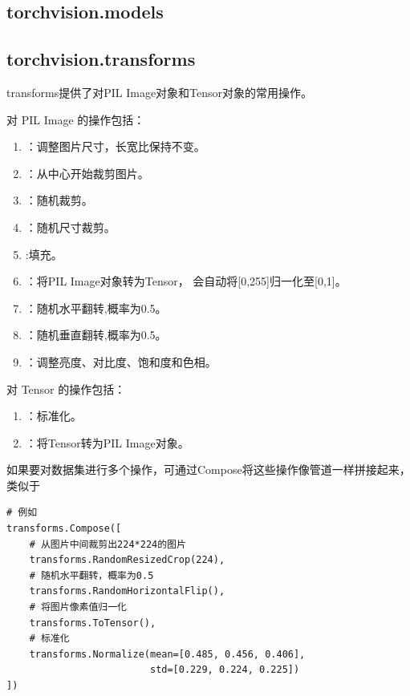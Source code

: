 \subsection{torchvision.models}
\label{subsec:pytorch_torchvision.models}

\subsection{torchvision.transforms}
\label{subsec:pytorch_torchvision.transforms}
transforms提供了对PIL Image对象和Tensor对象的常用操作。

对 PIL Image 的操作包括：
\begin{enumerate}[label=\arabic*)]
    \item {}：调整图片尺寸，长宽比保持不变。
    \item {}：从中心开始裁剪图片。
    \item {}：随机裁剪。
    \item {}：随机尺寸裁剪。
    \item {}:填充。
    \item {}：将PIL Image对象转为Tensor，
    会自动将[0,255]归一化至[0,1]。
    \item {}：随机水平翻转,概率为0.5。
    \item {}：随机垂直翻转,概率为0.5。
    \item {}：调整亮度、对比度、饱和度和色相。
\end{enumerate}

对 Tensor 的操作包括：
\begin{enumerate}[label=\arabic*)]
    \item {}：标准化。
    \item {}：将Tensor转为PIL Image对象。
\end{enumerate}

如果要对数据集进行多个操作，可通过Compose将这些操作像管道一样拼接起来，
类似于

\begin{lstlisting}[style=demostyle,numbers=none] 
# 例如    
transforms.Compose([
    # 从图片中间裁剪出224*224的图片
    transforms.RandomResizedCrop(224),
    # 随机水平翻转，概率为0.5
    transforms.RandomHorizontalFlip(),
    # 将图片像素值归一化
    transforms.ToTensor(),
    # 标准化
    transforms.Normalize(mean=[0.485, 0.456, 0.406],
                         std=[0.229, 0.224, 0.225])
])
\end{lstlisting}    



